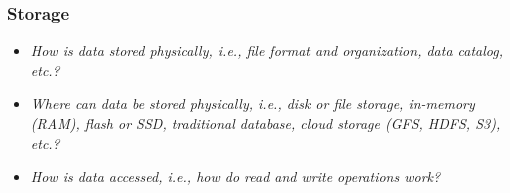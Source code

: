 
\begin{frame}
\frametitle{Storage}
\begin{itemize}
\item \emph{How is data stored physically, i.e., file format and organization, data catalog, etc.?}
\item \emph{Where can data be stored physically, i.e., disk or file storage, in-memory (RAM), flash or SSD, traditional database, cloud storage (GFS, HDFS, S3), etc.?}
\item \emph{How is data accessed, i.e., how do read and write operations work?}
\end{itemize}
\end{frame} 